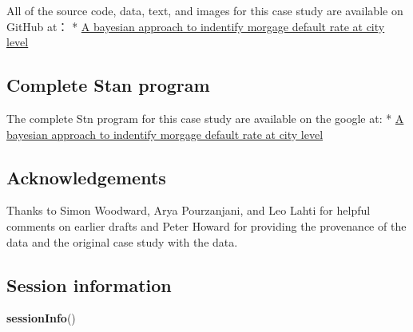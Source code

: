 \documentclass[]{tufte-handout}
\newenvironment{Shaded}{}{}
\newcommand{\KeywordTok}[1]{\textcolor[rgb]{0.00,0.44,0.13}{\textbf{#1}}}
\newcommand{\NormalTok}[1]{#1}
\begin{document}
All of the source code, data, text, and images for this case study are
available on GitHub at： *
\href{https://github.com/ChrisChen0429/BDA_project}{A bayesian approach
to indentify morgage default rate at city level}

\hypertarget{complete-stan-program}{%
\subsection*{Complete Stan program}\label{complete-stan-program}}

The complete Stn program for this case study are available on the google
at: *
\href{https://docs.google.com/document/d/1N0XtUlnsnYi_bInkrbTQG2DCD1Hf7mXaSoZWQbWrOqg/edit?usp=sharing}{A
bayesian approach to indentify morgage default rate at city level}

\hypertarget{acknowledgements}{%
\subsection*{Acknowledgements}\label{acknowledgements}}

Thanks to Simon Woodward, Arya Pourzanjani, and Leo Lahti for helpful
comments on earlier drafts and Peter Howard for providing the provenance
of the data and the original case study with the data.

\hypertarget{session-information}{%
\subsection*{Session information}\label{session-information}}

\begin{Shaded}
\begin{Highlighting}[]
\KeywordTok{sessionInfo}\NormalTok{()}
\end{Highlighting}
\end{Shaded}
\end{document}
